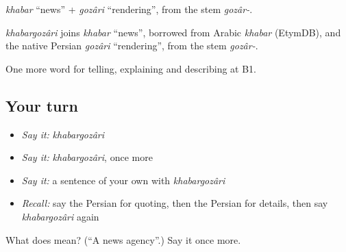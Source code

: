 \emph{khabar} \textquotedblleft{}news\textquotedblright{} + \emph{gozâri} \textquotedblleft{}rendering\textquotedblright{}, from the stem \emph{gozâr-}.

\begin{cousinweb}
\emph{khabargozâri} joins \emph{khabar} \textquotedblleft{}news\textquotedblright{}, borrowed from Arabic \emph{khabar} (EtymDB), and the native Persian \emph{gozâri} \textquotedblleft{}rendering\textquotedblright{}, from the stem \emph{gozâr-}.
\end{cousinweb}

\begin{grammarlens}[title={What you've built}]
One more word for telling, explaining and describing at B1.
\end{grammarlens}

\subsection*{Your turn}
\begin{itemize}
\raggedright
  \item \emph{Say it:} \emph{khabargozâri}
  \item \emph{Say it:} \emph{khabargozâri}, once more
  \item \emph{Say it:} a sentence of your own with \emph{khabargozâri}
  \item \emph{Recall:} say the Persian for quoting, then the Persian for details, then say \emph{khabargozâri} again
\end{itemize}

\begin{tcolorbox}[breakable,colback=teal!4,colframe=teal!35!black,title={Before you move on}]
What does  mean? (\textquotedblleft{}A news agency\textquotedblright{}.) Say it once more.
\end{tcolorbox}
